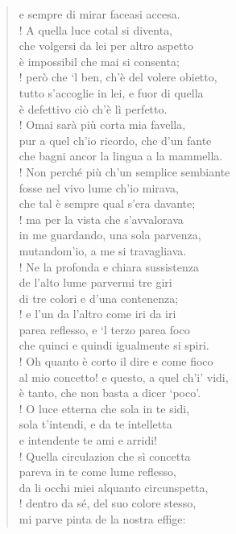 \documentclass[a4paper, twoside, titlepage]{book}
\begin{document}
\begin{verse}
e sempre di mirar faceasi accesa.\\!
A quella luce cotal si diventa,\\
che volgersi da lei per altro aspetto\\
è impossibil che mai si consenta;\\!
però che ‘l ben, ch’è del volere obietto,\\
tutto s’accoglie in lei, e fuor di quella\\
è defettivo ciò ch’è lì perfetto.\\!
Omai sarà più corta mia favella,\\
pur a quel ch’io ricordo, che d’un fante\\
che bagni ancor la lingua a la mammella.\\!
Non perché più ch’un semplice sembiante\\
fosse nel vivo lume ch’io mirava,\\
che tal è sempre qual s’era davante;\\!
ma per la vista che s’avvalorava\\
in me guardando, una sola parvenza,\\
mutandom’io, a me si travagliava.\\!
Ne la profonda e chiara sussistenza\\
de l’alto lume parvermi tre giri\\
di tre colori e d’una contenenza;\\!
e l’un da l’altro come iri da iri\\
parea reflesso, e ‘l terzo parea foco\\
che quinci e quindi igualmente si spiri.\\!
Oh quanto è corto il dire e come fioco\\
al mio concetto! e questo, a quel ch’i’ vidi,\\
è tanto, che non basta a dicer ‘poco’.\\!
O luce etterna che sola in te sidi,\\
sola t’intendi, e da te intelletta\\
e intendente te ami e arridi!\\!
Quella circulazion che sì concetta\\
pareva in te come lume reflesso,\\
da li occhi miei alquanto circunspetta,\\!
dentro da sé, del suo colore stesso,\\
mi parve pinta de la nostra effige:\\

\end{verse}
\end{document}
